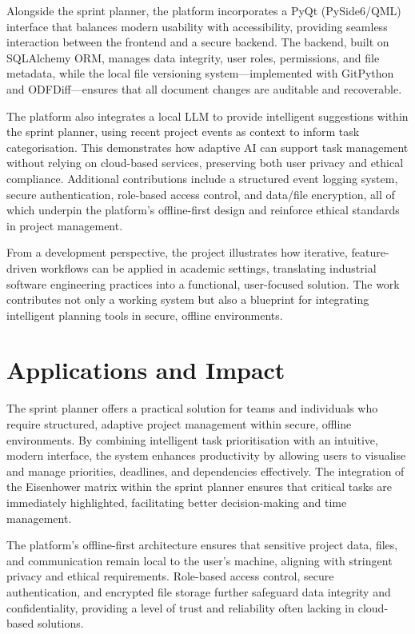 \documentclass{report}
\begin{document}
Alongside the sprint planner, the platform incorporates a PyQt (PySide6/QML) interface that balances modern usability with accessibility, providing seamless interaction between the frontend and a secure backend. The backend, built on SQLAlchemy ORM, manages data integrity, user roles, permissions, and file metadata, while the local file versioning system—implemented with GitPython and ODFDiff—ensures that all document changes are auditable and recoverable.

The platform also integrates a local LLM to provide intelligent suggestions within the sprint planner, using recent project events as context to inform task categorisation. This demonstrates how adaptive AI can support task management without relying on cloud-based services, preserving both user privacy and ethical compliance. Additional contributions include a structured event logging system, secure authentication, role-based access control, and data/file encryption, all of which underpin the platform's offline-first design and reinforce ethical standards in project management.

From a development perspective, the project illustrates how iterative, feature-driven workflows can be applied in academic settings, translating industrial software engineering practices into a functional, user-focused solution. The work contributes not only a working system but also a blueprint for integrating intelligent planning tools in secure, offline environments.
\section{Applications and Impact}
The sprint planner offers a practical solution for teams and individuals who require structured, adaptive project management within secure, offline environments. By combining intelligent task prioritisation with an intuitive, modern interface, the system enhances productivity by allowing users to visualise and manage priorities, deadlines, and dependencies effectively. The integration of the Eisenhower matrix within the sprint planner ensures that critical tasks are immediately highlighted, facilitating better decision-making and time management.

The platform's offline-first architecture ensures that sensitive project data, files, and communication remain local to the user's machine, aligning with stringent privacy and ethical requirements. Role-based access control, secure authentication, and encrypted file storage further safeguard data integrity and confidentiality, providing a level of trust and reliability often lacking in cloud-based solutions.
\end{document}
